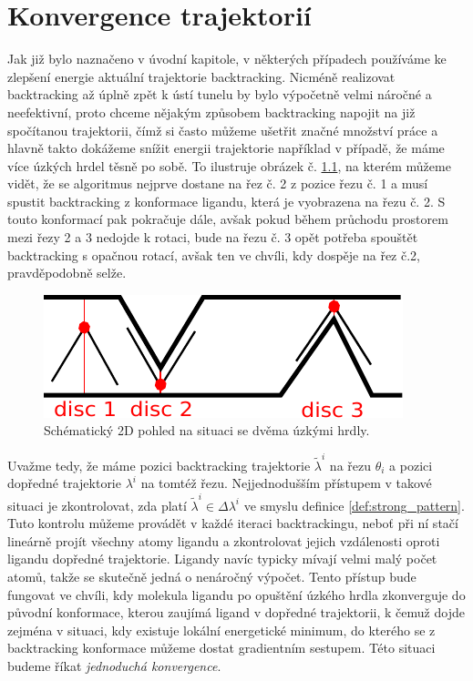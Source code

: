 \chapter{Konvergence trajektorií}
Jak již bylo naznačeno v úvodní kapitole, v některých případech používáme ke
zlepšení energie aktuální trajektorie backtracking. Nicméně realizovat
backtracking až úplně zpět k ústí tunelu by bylo výpočetně velmi náročné
a neefektivní, proto chceme nějakým způsobem backtracking napojit na již
spočítanou trajektorii, čímž si často můžeme ušetřit značné množství práce a hlavně
takto dokážeme snížit energii trajektorie například v případě, že máme více úzkých
hrdel těsně po sobě. To ilustruje obrázek č. \ref{fig:two_bottlenecks}, na kterém
můžeme vidět, že se algoritmus nejprve dostane na řez č. 2 z pozice řezu č. 1
a musí spustit backtracking z konformace ligandu, která je vyobrazena na řezu č. 2.
S touto konformací pak pokračuje dále, avšak pokud během průchodu prostorem
mezi řezy 2 a 3 nedojde k rotaci, bude na řezu č. 3 opět potřeba spouštět
backtracking s opačnou rotací, avšak ten ve chvíli, kdy dospěje na řez č.2,
pravděpodobně selže.

\begin{figure}[ht]
\centering
\includegraphics[width=.5\hsize]{img/two_bottlenecks.pdf}
\caption{Schématický 2D pohled na situaci se dvěma úzkými hrdly.}
\label{fig:two_bottlenecks}
\end{figure}

Uvažme tedy, že máme pozici backtracking trajektorie $ \tilde{\lambda}^i $
na řezu $ \theta_i $ a pozici dopředné trajektorie $ \lambda^i $ na tomtéž řezu.
Nejjednodušším přístupem v takové situaci je zkontrolovat, zda platí
$ \tilde{\lambda}^i \in \Delta \lambda^i $ ve smyslu definice \ref{def:strong_pattern}.
Tuto kontrolu můžeme provádět v každé
iteraci backtrackingu, neboť při ní stačí lineárně projít všechny atomy ligandu
a zkontrolovat jejich vzdálenosti oproti ligandu dopředné trajektorie. Ligandy
navíc typicky mívají velmi malý počet atomů, takže se skutečně jedná o nenáročný
výpočet. Tento přístup bude fungovat ve chvíli, kdy molekula ligandu po opuštění
úzkého hrdla zkonverguje do původní konformace, kterou zaujímá ligand v dopředné
trajektorii, k čemuž dojde zejména v situaci, kdy existuje lokální energetické
minimum, do kterého se z backtracking konformace můžeme dostat gradientním sestupem.
Této situaci budeme říkat \textit{jednoduchá konvergence}.

